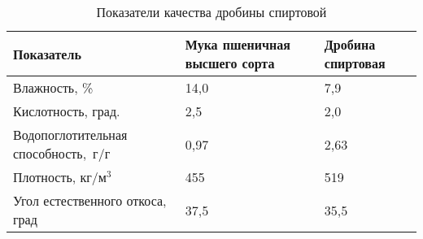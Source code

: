 \begin{longtable}{|X|Y|Y|}
\caption{\label{tab:cake_sostav}Показатели качества дробины спиртовой}
\tabularnewline
\hline
Показатель & Мука пшеничная высшего сорта & Дробина спиртовая \\
\hline
Влажность, \% &       14,0 &        7,9 \\
\hline
Кислотность, град. &        2,5 &        2,0 \\
\hline
Водопоглотительная способность,~г/г &       0,97 &       2,63 \\
\hline
Плотность, кг/м$^3$ &        455 &        519 \\
\hline
Угол естественного откоса, град &       37,5 &       35,5 \\
\hline
\end{longtable}  
